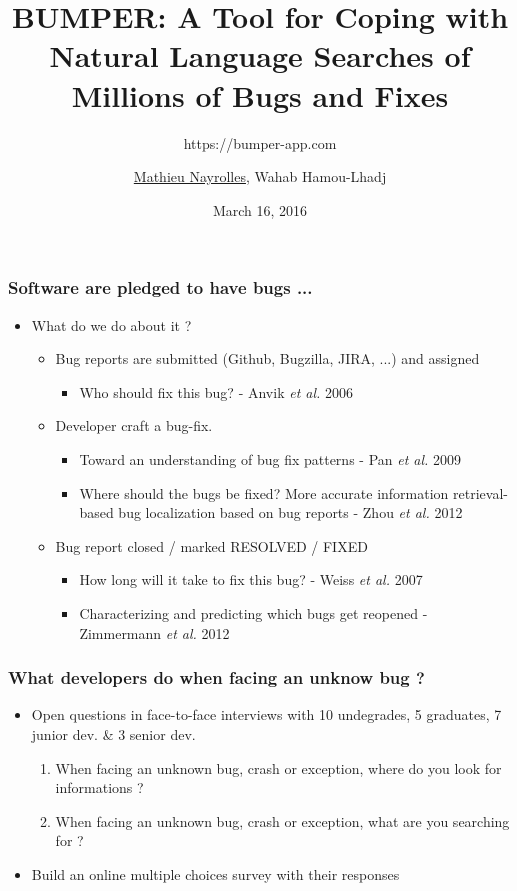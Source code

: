 \documentclass{beamer}
\title[BUMPER]{BUMPER: A Tool for Coping with Natural Language Searches of Millions of Bugs and Fixes} %
\subtitle{https://bumper-app.com}
\author[Mathieu Nayrolles]{\underline{Mathieu Nayrolles}, Wahab Hamou-Lhadj} %
\institute[Concordia] %
{
Software Behaviour Analysis (SBA) Research Lab, ECE,  Concordia, Montr\'eal, Canada
\medskip
\textit{mathieu.nayrolles@gmail.com, wahab.hamou-lhadj@concordia.ca} %
}
\date{March 16, 2016} %
\begin{document}
\begin{frame}
\titlepage %
\end{frame}


\begin{frame}
\frametitle{Software are pledged to have bugs ... }


\vspace{0.3cm}
\begin{itemize}
\item What do we do about it ?
\vspace{0.3cm}
\begin{itemize}
\vspace{0.3cm}
\item Bug reports are submitted (Github, Bugzilla, JIRA, ...) and assigned
\begin{itemize}
\item Who should fix this bug? - Anvik \textit{et al.} 2006
\end{itemize}
\item Developer craft a bug-fix.
\begin{itemize}
\item Toward an understanding of bug fix patterns - Pan \textit{et al.} 2009
\item Where should the bugs be fixed? More accurate information retrieval-based bug localization based on bug reports - Zhou \textit{et al.} 2012
\end{itemize}
\item Bug report closed / marked RESOLVED / FIXED
\begin{itemize}
\item How long will it take to fix this bug? - Weiss \textit{et al.} 2007
\item Characterizing and predicting which bugs get reopened - Zimmermann \textit{et al.} 2012
\end{itemize}
\end{itemize}
\end{itemize}
\end{frame}

\begin{frame}
\frametitle{What developers do when facing an unknow bug ?}

\begin{itemize}
\item Open questions in face-to-face interviews with 10 undegrades, 5 graduates, 7 junior dev. \& 3 senior dev.


\begin{enumerate}
  \item When facing an unknown bug, crash or exception, where do you look for informations ?
  \item When facing an unknown bug, crash or exception, what are you searching for ?
\end{enumerate}


\item Build an online multiple choices survey with their responses

\end{itemize}

\end{frame}
\end{document}
